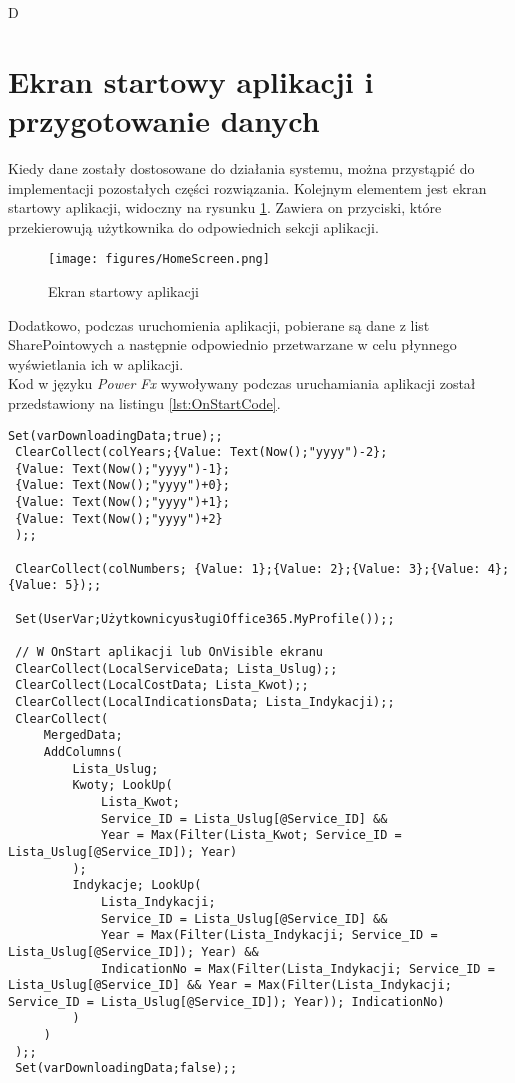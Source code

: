 D\section{Ekran startowy aplikacji i przygotowanie danych}
Kiedy dane zostały dostosowane do działania systemu, można przystąpić do implementacji pozostałych części rozwiązania.
Kolejnym elementem jest ekran startowy aplikacji, widoczny na rysunku \ref{fig:homescreen}. Zawiera on przyciski, które przekierowują użytkownika do odpowiednich sekcji aplikacji.

\begin{figure}[h]
    \centering
    \texttt{[image: figures/HomeScreen.png]}
    \caption{Ekran startowy aplikacji} 
    \label{fig:homescreen}
\end{figure}

Dodatkowo, podczas uruchomienia aplikacji, pobierane są dane z list SharePointowych a następnie odpowiednio przetwarzane w celu płynnego wyświetlania ich w aplikacji. \\
Kod w języku \emph{Power Fx} wywoływany podczas uruchamiania aplikacji został przedstawiony na listingu \ref{lst:OnStartCode}.

\begin{lstlisting}[language=PowerFx]
 Set(varDownloadingData;true);;
 ClearCollect(colYears;{Value: Text(Now();"yyyy")-2};
 {Value: Text(Now();"yyyy")-1};
 {Value: Text(Now();"yyyy")+0};
 {Value: Text(Now();"yyyy")+1};
 {Value: Text(Now();"yyyy")+2}
 );;
 
 ClearCollect(colNumbers; {Value: 1};{Value: 2};{Value: 3};{Value: 4};{Value: 5});;
 
 Set(UserVar;UżytkownicyusługiOffice365.MyProfile());;
 
 // W OnStart aplikacji lub OnVisible ekranu
 ClearCollect(LocalServiceData; Lista_Uslug);;
 ClearCollect(LocalCostData; Lista_Kwot);;
 ClearCollect(LocalIndicationsData; Lista_Indykacji);;
 ClearCollect(
     MergedData;
     AddColumns(
         Lista_Uslug;
         Kwoty; LookUp(
             Lista_Kwot;
             Service_ID = Lista_Uslug[@Service_ID] &&
             Year = Max(Filter(Lista_Kwot; Service_ID = Lista_Uslug[@Service_ID]); Year)
         );
         Indykacje; LookUp(
             Lista_Indykacji;
             Service_ID = Lista_Uslug[@Service_ID] &&
             Year = Max(Filter(Lista_Indykacji; Service_ID = Lista_Uslug[@Service_ID]); Year) &&
             IndicationNo = Max(Filter(Lista_Indykacji; Service_ID = Lista_Uslug[@Service_ID] && Year = Max(Filter(Lista_Indykacji; Service_ID = Lista_Uslug[@Service_ID]); Year)); IndicationNo)
         )
     )
 );;
 Set(varDownloadingData;false);;
 \end{lstlisting}

